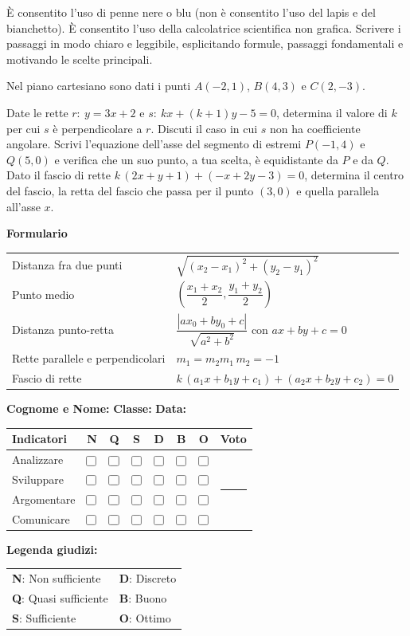 \documentclass[a4paper,10pt]{exam}
\makeatletter
\newcommand{\cbox}{\ensuremath{\vcenter{\hbox{\tikz{\draw[black!75, line width=0.5pt, rounded corners=1.2pt] (0,0) rectangle (3.0mm, 3.0mm);}}}}}
\newcommand{\grigliacompetenze}{
\vspace{1mm}
\noindent
\begin{minipage}[c]{0.62\linewidth}
\footnotesize
\setlength{\aboverulesep}{0pt}
\setlength{\belowrulesep}{0pt}
\renewcommand{\arraystretch}{1.25}
\begin{tabular}{l cc >{\columncolor{gray!20}}c ccc c}
\toprule
\rowcolor{gray!10}
\textbf{Indicatori} & \textbf{N} & \textbf{Q} & \cellcolor{gray!20}\textbf{S} & \textbf{D} & \textbf{B} & \textbf{O} & \textbf{Voto} \\
\midrule
Analizzare    & \cbox & \cbox & \cbox & \cbox & \cbox & \cbox & \multirow{4}{*}{\rule{1.4cm}{0pt}} \\
Sviluppare    & \cbox & \cbox & \cbox & \cbox & \cbox & \cbox & \\
Argomentare   & \cbox & \cbox & \cbox & \cbox & \cbox & \cbox & \\
Comunicare    & \cbox & \cbox & \cbox & \cbox & \cbox & \cbox & \\
\bottomrule
\end{tabular}
\end{minipage}\hfill
\begin{minipage}[c]{0.35\linewidth}
\scriptsize \color{black!75}
\textbf{Legenda giudizi:}\par\vspace{1mm}
\begin{tabular}{@{}ll@{}}
\textbf{N}: Non sufficiente & \textbf{D}: Discreto \\
\textbf{Q}: Quasi sufficiente & \textbf{B}: Buono \\
\textbf{S}: Sufficiente & \textbf{O}: Ottimo \\
\end{tabular}
\end{minipage}
}
\newcommand{\supportiprova}[1]{%
  \par\noindent\begin{minipage}{\linewidth}\small
  #1
  \end{minipage}\par\vspace{3mm}%
}
\makeatother
\begin{document}
\begin{tcolorbox}[istruzionibox]
È consentito l'uso di penne nere o blu (non è consentito l'uso del lapis e del bianchetto).
È consentito l'uso della calcolatrice scientifica non grafica.
Scrivere i passaggi in modo chiaro e leggibile, esplicitando formule, passaggi fondamentali e motivando le scelte principali.
\end{tcolorbox}

\vspace{1.5mm}


\begin{questions}
\question Nel piano cartesiano sono dati i punti $A(-2,1)$, $B(4,3)$ e $C(2,-3)$.
\question Date le rette $r:\ y=3x+2$ e $s:\ kx+(k+1)y-5=0$, determina il valore di $k$ per cui $s$ è perpendicolare a $r$. Discuti il caso in cui $s$ non ha coefficiente angolare.
\question Scrivi l'equazione dell'asse del segmento di estremi $P(-1,4)$ e $Q(5,0)$ e verifica che un suo punto, a tua scelta, è equidistante da $P$ e da $Q$.
\question Dato il fascio di rette $k\,(2x+y+1)+(-x+2y-3)=0$, determina il centro del fascio, la retta del fascio che passa per il punto $(3,0)$ e quella parallela all'asse $x$.
\end{questions}
\null
\vfill

\supportiprova{\textbf{Formulario}\\[1mm]
\begin{tabular}{@{}ll@{}}
Distanza fra due punti & $\sqrt{(x_2-x_1)^2+(y_2-y_1)^2}$ \\
Punto medio & $\left(\dfrac{x_1+x_2}{2},\dfrac{y_1+y_2}{2}\right)$ \\
Distanza punto-retta & $\dfrac{|ax_0+by_0+c|}{\sqrt{a^2+b^2}}$ con $ax+by+c=0$ \\
Rette parallele e perpendicolari & $m_1=m_2$\quad $m_1\,m_2=-1$ \\
Fascio di rette & $k\,(a_1x+b_1y+c_1)+(a_2x+b_2y+c_2)=0$ \\
\end{tabular}}
\noindent
\textbf{Cognome e Nome:}\enspace\hrulefill\hspace{1cm}%
\textbf{Classe:}\enspace\makebox[2.5cm]{\hrulefill}\hspace{1cm}%
\textbf{Data:}\enspace\makebox[2.5cm]{\hrulefill}

\vspace{3mm}
\grigliacompetenze
\end{document}
